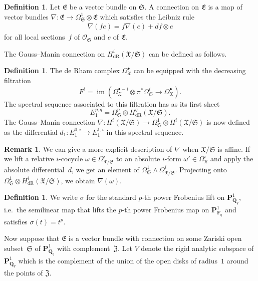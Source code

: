 \documentclass[a4paper,11pt]{article}
\numberwithin{equation}{section}
\newcommand{\QQ}{\mathbf{Q}} %
\newcommand{\FF}{\mathbf{F}} %
\DeclareMathOperator{\fIm}{im}       %
\providecommand{\HdR}{H_{\text{dR}}}    %
\theoremstyle{definition}
\newtheorem{defn}[thm]{Definition}
\newtheorem{rem}[thm]{Remark}
\begin{document}
\begin{defn}
Let $\mathfrak{E}$ be a vector bundle on $\mathfrak{S}$. A connection on 
$\mathfrak{E}$ is a map of vector bundles 
$\nabla: \mathfrak{E} \rightarrow \Omega^1_{\mathfrak{S}} \otimes \mathfrak{E}$
which satisfies the Leibniz rule
\begin{align*}
\nabla(f e)=f\nabla(e)+df \otimes e
\end{align*} 
for all local sections~$f$ of $\mathcal{O}_{\mathfrak{S}}$ and $e$ 
of $\mathfrak{E}$.
\end{defn}

The Gauss--Manin connection on $\HdR^i(\mathfrak{X}/\mathfrak{S})$ can 
be defined as follows.

\begin{defn}
The de Rham complex $\Omega^{\bullet}_{\mathfrak{X}}$ can be equipped 
with the decreasing filtration
\[
F^i=\fIm(\Omega^{\bullet-i}_{\mathfrak{X}} \otimes \pi^* \Omega^i_{\mathfrak{S}} \rightarrow \Omega^{\bullet}_{\mathfrak{X}}). 
\]
The spectral sequence associated to this filtration has as its first sheet 
\[
E_1^{p,q}=\Omega^p_{\mathfrak{S}} \otimes \HdR^q(\mathfrak{X}/\mathfrak{S}).
\]
The Gauss--Manin connection 
$\nabla:H^i(\mathfrak{X}/\mathfrak{S}) \rightarrow \Omega^1_{\mathfrak{S}} \otimes H^i(\mathfrak{X}/\mathfrak{S})$ 
is now defined as the differential $d_1: E_1^{0,i} \rightarrow E_1^{1,i}$ 
in this spectral sequence.
\end{defn}

\begin{rem}
We can give a more explicit description of $\nabla$ when 
$\mathfrak{X}/\mathfrak{S}$ is affine. If we lift a relative $i$-cocycle 
$\omega \in \Omega^i_{\mathfrak{X}/\mathfrak{S}}$ to an absolute $i$-form 
$\omega' \in \Omega^i_{\mathfrak{X}}$ and apply the absolute differential~$d$, 
we get an element of 
$\Omega^1_{\mathfrak{S}} \wedge \Omega^i_{\mathfrak{X}/\mathfrak{S}}$. 
Projecting onto 
$\Omega^1_{\mathfrak{S}} \otimes \HdR^i(\mathfrak{X}/\mathfrak{S})$, 
we obtain $\nabla(\omega)$. 
\end{rem}

\begin{defn} \label{defn:sigma}
We write $\sigma$ for the standard $p$-th power Frobenius lift on 
$\mathbf{P}^1_{\QQ_q}$, i.e.\ the semilinear map that lifts the $p$-th power 
Frobenius map on $\mathbf{P}^1_{\FF_q}$ and satisfies $\sigma(t)=t^p$. 
\end{defn}

Now suppose that $\mathfrak{E}$ is a vector bundle with connection on 
some Zariski open subset~$\mathfrak{S}$ of $\mathbf{P}^1_{\QQ_q}$ with 
complement~$\mathfrak{Z}$. Let $V$ denote the rigid analytic subspace 
of $\mathbf{P}^1_{\QQ_q}$ which is the complement of the union of the 
open disks of radius~$1$ around the points of $\mathfrak{Z}$.
\end{document}
